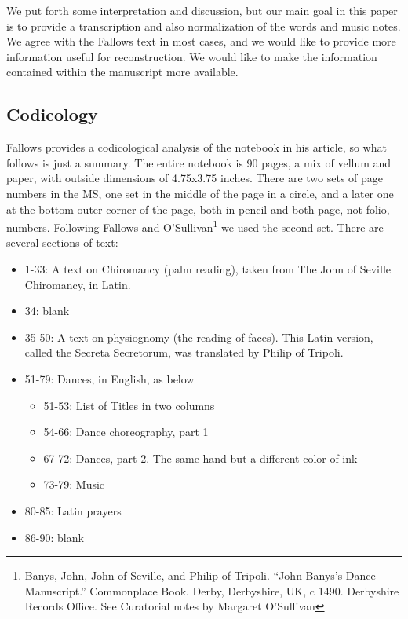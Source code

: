 \documentclass[12pt,letter]{article} %
\begin{document}
We put forth some interpretation and discussion, but our main goal in this paper is to provide a transcription and also normalization of the words and music notes. We agree with the Fallows text in most cases, and we would like to provide more information useful for reconstruction. We would like to make the information contained within the manuscript more available.

\subsection{Codicology}
Fallows provides a codicological analysis of the notebook in his article, so what follows is just a summary.  The entire notebook is 90 pages, a mix of vellum and paper, with outside dimensions of 4.75x3.75 inches.  There are two sets of page numbers in the MS, one set in the middle of the page in a circle, and a later one at the bottom outer corner of the page, both in pencil and both page, not folio, numbers.  Following Fallows and O’Sullivan\footnote{Banys, John, John of Seville, and Philip of Tripoli. “John Banys’s Dance Manuscript.” Commonplace Book. Derby, Derbyshire, UK, c 1490. Derbyshire Records Office.  See Curatorial notes by Margaret O’Sullivan} we used the second set. There are several sections of text:
\begin{itemize}
\item 1-33: A text on Chiromancy (palm reading), taken from The John of Seville Chiromancy, in Latin.
\item 34: blank
\item 35-50: A text on physiognomy (the reading of faces).  This Latin version, called the Secreta Secretorum, was translated by Philip of Tripoli. 
\item 51-79: Dances, in English, as below
\begin{itemize}
\item 51-53: List of Titles in two columns
\item 54-66: Dance choreography, part 1
\item 67-72: Dances, part 2.  The same hand but a different color of ink
\item 73-79: Music
\end{itemize}
\item 80-85: Latin prayers
\item 86-90: blank
\end{itemize}
\end{document}
